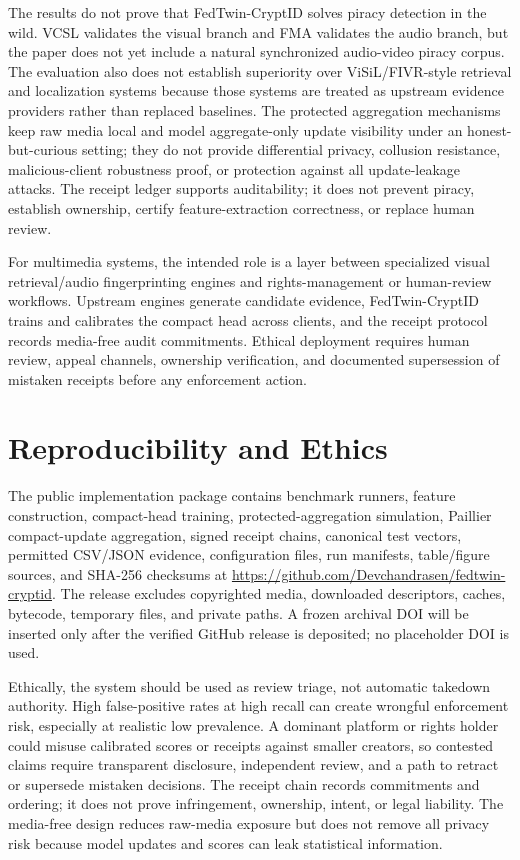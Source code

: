 \documentclass[journal]{IEEEtran}
\newcommand{\ours}{FedTwin-CryptID}
\begin{document}
The results do not prove that \ours{} solves piracy detection in the wild. VCSL validates the visual branch and FMA validates the audio branch, but the paper does not yet include a natural synchronized audio-video piracy corpus. The evaluation also does not establish superiority over ViSiL/FIVR-style retrieval and localization systems because those systems are treated as upstream evidence providers rather than replaced baselines. The protected aggregation mechanisms keep raw media local and model aggregate-only update visibility under an honest-but-curious setting; they do not provide differential privacy, collusion resistance, malicious-client robustness proof, or protection against all update-leakage attacks. The receipt ledger supports auditability; it does not prevent piracy, establish ownership, certify feature-extraction correctness, or replace human review.

For multimedia systems, the intended role is a layer between specialized visual retrieval/audio fingerprinting engines and rights-management or human-review workflows. Upstream engines generate candidate evidence, \ours{} trains and calibrates the compact head across clients, and the receipt protocol records media-free audit commitments. Ethical deployment requires human review, appeal channels, ownership verification, and documented supersession of mistaken receipts before any enforcement action.

\section{Reproducibility and Ethics}

The public implementation package contains benchmark runners, feature construction, compact-head training, protected-aggregation simulation, Paillier compact-update aggregation, signed receipt chains, canonical test vectors, permitted CSV/JSON evidence, configuration files, run manifests, table/figure sources, and SHA-256 checksums at \url{https://github.com/Devchandrasen/fedtwin-cryptid}. The release excludes copyrighted media, downloaded descriptors, caches, bytecode, temporary files, and private paths. A frozen archival DOI will be inserted only after the verified GitHub release is deposited; no placeholder DOI is used.

Ethically, the system should be used as review triage, not automatic takedown authority. High false-positive rates at high recall can create wrongful enforcement risk, especially at realistic low prevalence. A dominant platform or rights holder could misuse calibrated scores or receipts against smaller creators, so contested claims require transparent disclosure, independent review, and a path to retract or supersede mistaken decisions. The receipt chain records commitments and ordering; it does not prove infringement, ownership, intent, or legal liability. The media-free design reduces raw-media exposure but does not remove all privacy risk because model updates and scores can leak statistical information.
\end{document}
